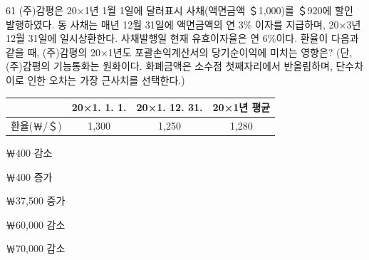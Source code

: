 \begin{question}{61}
(주)감평은 20×1년 1월 1일에 달러표시 사채(액면금액 ＄1,000)를 ＄920에 할인 발행하였다. 동 사채는 매년 12월 31일에 액면금액의 연 3\% 이자를 지급하며, 20×3년 12월 31일에 일시상환한다. 사채발행일 현재 유효이자율은 연 6\%이다. 환율이 다음과 같을 때, (주)감평의 20×1년도 포괄손익계산서의 당기순이익에 미치는 영향은? (단, (주)감평의 기능통화는 원화이다. 화폐금액은 소수점 첫째자리에서 반올림하며, 단수차이로 인한 오차는 가장 근사치를 선택한다.)
\par{\small\centering\begin{tabular}{|c|c|c|c|}\hline
 & 20×1. 1. 1. & 20×1. 12. 31. & 20×1년 평균 \tabularnewline\hline
환율(￦/＄) & 1,300 & 1,250 & 1,280 \tabularnewline\hline
\end{tabular}\par}
\begin{choices}
  \item ￦400 감소
  \item ￦400 증가
  \item ￦37,500 증가
  \item ￦60,000 감소
  \item ￦70,000 감소
\end{choices}
\end{question}
\answerall
{}
